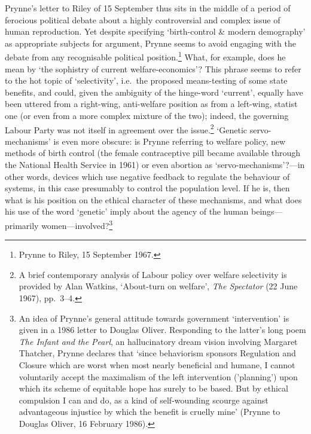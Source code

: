 \documentclass[]{article}
\begin{document}
Prynne’s letter to Riley of 15 September thus sits in the middle of a
period of ferocious political debate about a highly controversial and
complex issue of human reproduction. Yet despite specifying
‘birth-control \& modern demography’ as appropriate subjects for
argument, Prynne seems to avoid engaging with the debate from any
recognisable political position.\footnote{Prynne to Riley, 15 September
  1967.} What, for example, does he mean by ‘the sophistry of current
welfare-economics’? This phrase seems to refer to the hot topic of
‘selectivity’, i.e.~the proposed means-testing of some state benefits,
and could, given the ambiguity of the hinge-word ‘current’, equally have
been uttered from a right-wing, anti-welfare position as from a
left-wing, statist one (or even from a more complex mixture of the two);
indeed, the governing Labour Party was not itself in agreement over the
issue.\footnote{A brief contemporary analysis of Labour policy over
  welfare selectivity is provided by Alan Watkins, ‘About-turn on
  welfare’, \emph{The Spectator} (22 June 1967), pp.~3–4.} ‘Genetic
servo-mechanisms’ is even more obscure: is Prynne referring to welfare
policy, new methods of birth control (the female contraceptive pill
became available through the National Health Service in 1961) or even
abortion as ‘servo-mechanisms’?—in other words, devices which use
negative feedback to regulate the behaviour of systems, in this case
presumably to control the population level. If he is, then what is his
position on the ethical character of these mechanisms, and what does his
use of the word ‘genetic’ imply about the agency of the human
beings—primarily women—involved?\footnote{An idea of Prynne’s general
  attitude towards government ‘intervention’ is given in a 1986 letter
  to Douglas Oliver. Responding to the latter’s long poem \emph{The
  Infant and the Pearl}, an hallucinatory dream vision involving
  Margaret Thatcher, Prynne declares that ‘since behaviorism sponsors
  Regulation and Closure which are worst when most nearly beneficial and
  humane, I cannot voluntarily accept the maximalism of the left
  intervention (’planning’) upon which its scheme of equitable hope has
  surely to be based. But by ethical compulsion I can and do, as a kind
  of self-wounding scourge against advantageous injustice by which the
  benefit is cruelly mine’ (Prynne to Douglas Oliver, 16 February 1986).}
\end{document}
